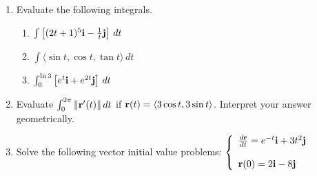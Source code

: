 \documentclass[12pt]{article}
\newif\ifans
\begin{document}
\begin{enumerate}
\ifans{\fbox{\parbox{1\linewidth}{The order of the terms matters when dealing with cross products.  The correct derivative statement is:
$$\frac{d}{dt}\left[{\bf r_1}(t)\times{\bf r_2}(t)\right]={\bf r_1}(t)\times {\bf r_2}^{\prime}(t)+{\bf r_1}^{\prime}(t)\times{\bf r_2}(t)$$}}} \fi

\item Evaluate the following integrals.

\begin{enumerate}

\item $\int \left[(2t+1)^5{\bf i}-\frac{1}{t}{\bf j}\right]\,dt$

\ifans{\fbox{$\left(\frac{1}{12}(2t+1)^6+c_1\right){\bf i}-(\ln{|t|}+c_2){\bf j}$; i.e., $\left\langle\frac{1}{12}(2t+1)^6,-\ln{|t|}\right\rangle+\overrightarrow{c}$}} \fi

\item $\int \langle \sin{t},\cos{t},\tan{t} \rangle \,dt$

\ifans{\fbox{\parbox{1\linewidth}{$(-\cos{t}+c_1){\bf i}+(\sin{t}+c_2){\bf j}+(\ln{|\sec{t}|}+c_3){\bf k}$; or, equivalently,
$\left\langle -\cos{t}, \sin{t}, \ln{|\sec{t}|}\right\rangle+\overrightarrow{c}$}}} \fi

\item $\int_0^{\ln3} \left[e^t{\bf i}+e^{2t}{\bf j}\right] \,dt$

\ifans{\fbox{$\langle 2,4 \rangle$}} \fi

\end{enumerate}

\item  Evaluate $\int_0^{2\pi} \|{\bf r}^{\prime}(t)\| \,dt$ if ${\bf r}(t)=\langle 3\cos{t}, 3\sin{t} \rangle$.  Interpret your answer geometrically.

\ifans{\fbox{\parbox{1\linewidth}{$6\pi$.  The given curve represents a circle centered at the origin with a radius of 3; this integral gives the arc length (circumference) of the circle.}}} \fi

\item Solve the following vector initial value problems: $\left\{\begin{array}{l}
\frac{d{\bf r}}{dt}=e^{-t}{\bf i}+3t^2{\bf j}\\
\\
{\bf r}(0)=2{\bf i}-8{\bf j}\end{array}\right.$

\ifans{\fbox{${\bf r}(t)=\langle -e^{-t}+3, t^3-8 \rangle$}} \fi


\end{enumerate}
\end{document}
